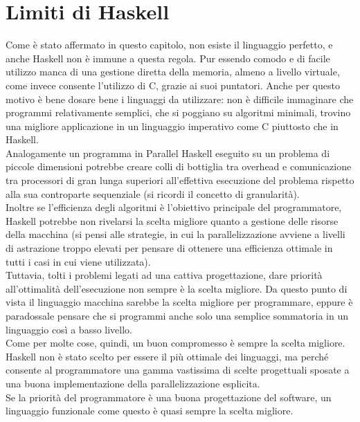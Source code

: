 \section{Limiti di Haskell}
Come è stato affermato in questo capitolo, non esiste il linguaggio perfetto, e anche Haskell non è immune a questa regola. Pur essendo comodo e di facile utilizzo manca di una gestione diretta della memoria, almeno a livello virtuale, come invece consente l'utilizzo di C, grazie ai suoi puntatori. Anche per questo motivo è bene dosare bene i linguaggi da utilizzare: non è difficile immaginare che programmi relativamente semplici, che si poggiano su algoritmi minimali, trovino una migliore applicazione in un linguaggio imperativo come C piuttosto che in Haskell.\\
Analogamente un programma in Parallel Haskell eseguito su un problema di piccole dimensioni potrebbe creare colli di bottiglia tra overhead e comunicazione tra processori di gran lunga superiori all'effettiva esecuzione del problema rispetto alla sua controparte sequenziale (si ricordi il concetto di granularità).\\
Inoltre se l'efficienza degli algoritmi è l'obiettivo principale del programmatore, Haskell potrebbe non rivelarsi la scelta migliore quanto a gestione delle risorse della macchina (si pensi alle strategie, in cui la parallelizzazione avviene a livelli di astrazione troppo elevati per pensare di ottenere una efficienza ottimale in tutti i casi in cui viene utilizzata).\\
Tuttavia, tolti i problemi legati ad una cattiva progettazione, dare priorità all'ottimalità dell'esecuzione non sempre è la scelta migliore. Da questo punto di vista il linguaggio macchina sarebbe la scelta migliore per programmare, eppure è paradossale pensare che si programmi anche solo una semplice sommatoria in un linguaggio così a basso livello.\\
Come per molte cose, quindi, un buon compromesso è sempre la scelta migliore. Haskell non è stato scelto per essere il più ottimale dei linguaggi, ma perché consente al programmatore una gamma vastissima di scelte progettuali sposate a una buona implementazione della parallelizzazione esplicita.\\
Se la priorità del programmatore è una buona progettazione del software, un linguaggio funzionale come questo è quasi sempre la scelta migliore.
